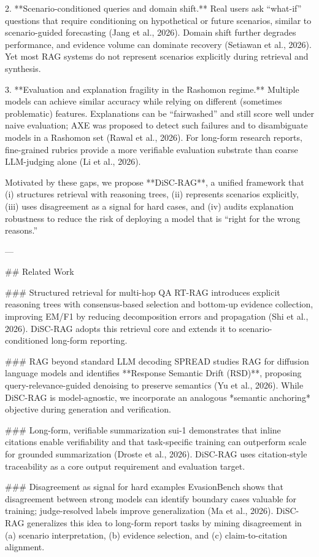 2. **Scenario-conditioned queries and domain shift.** Real users ask “what-if” questions that require conditioning on hypothetical or future scenarios, similar to scenario-guided forecasting (Jang et al., 2026). Domain shift further degrades performance, and evidence volume can dominate recovery (Setiawan et al., 2026). Yet most RAG systems do not represent scenarios explicitly during retrieval and synthesis.

3. **Evaluation and explanation fragility in the Rashomon regime.** Multiple models can achieve similar accuracy while relying on different (sometimes problematic) features. Explanations can be “fairwashed” and still score well under naive evaluation; AXE was proposed to detect such failures and to disambiguate models in a Rashomon set (Rawal et al., 2026). For long-form research reports, fine-grained rubrics provide a more verifiable evaluation substrate than coarse LLM-judging alone (Li et al., 2026).

Motivated by these gaps, we propose **DiSC-RAG**, a unified framework that (i) structures retrieval with reasoning trees, (ii) represents scenarios explicitly, (iii) uses disagreement as a signal for hard cases, and (iv) audits explanation robustness to reduce the risk of deploying a model that is “right for the wrong reasons.”

---

## Related Work  

### Structured retrieval for multi-hop QA  
RT-RAG introduces explicit reasoning trees with consensus-based selection and bottom-up evidence collection, improving EM/F1 by reducing decomposition errors and propagation (Shi et al., 2026). DiSC-RAG adopts this retrieval core and extends it to scenario-conditioned long-form reporting.

### RAG beyond standard LLM decoding  
SPREAD studies RAG for diffusion language models and identifies **Response Semantic Drift (RSD)**, proposing query-relevance-guided denoising to preserve semantics (Yu et al., 2026). While DiSC-RAG is model-agnostic, we incorporate an analogous *semantic anchoring* objective during generation and verification.

### Long-form, verifiable summarization  
sui-1 demonstrates that inline citations enable verifiability and that task-specific training can outperform scale for grounded summarization (Droste et al., 2026). DiSC-RAG uses citation-style traceability as a core output requirement and evaluation target.

### Disagreement as signal for hard examples  
EvasionBench shows that disagreement between strong models can identify boundary cases valuable for training; judge-resolved labels improve generalization (Ma et al., 2026). DiSC-RAG generalizes this idea to long-form report tasks by mining disagreement in (a) scenario interpretation, (b) evidence selection, and (c) claim-to-citation alignment.

